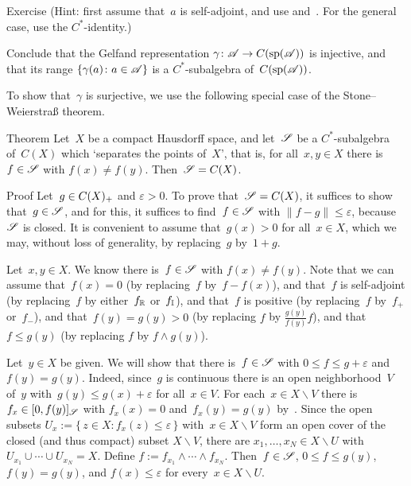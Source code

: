 \documentclass[a]{subfiles}
\begin{document}
\begin{parsec}
\begin{point}{Exercise}
(Hint: first assume that~$a$ is self-adjoint,
and use  and~.
For the general case,
use the $C^*$-identity.)

Conclude that the Gelfand representation $\gamma\colon \mathscr{A}\to C(\mathrm{sp}(\mathscr{A}))$
is injective,
and that its range $\{\gamma(a)\colon a\in\mathscr{A}\}$
is a $C^*$-subalgebra of~$C(\mathrm{sp}(\mathscr{A}))$.
\end{point}
\begin{point}%
To show that~$\gamma$ is surjective,
we use the following special case of
the Stone--Weierstra\ss{} theorem. 
\end{point}
\begin{point}{Theorem}%
Let~$X$ be a compact Hausdorff space,
and let~$\mathscr{S}$ be a $C^*$-subalgebra of~$C(X)$
which `separates the points of~$X$',
that is, for all~$x,y\in X$
there is~$f\in \mathscr{S}$ with $f(x)\neq f(y)$.
Then~$\mathscr{S}=C(X)$.
\begin{point}{Proof}%
Let~$g\in C(X)_{+}$ and $\varepsilon >0$.
To prove that~$\mathscr{S}=C(X)$,
it suffices to show that~$g\in \mathscr{S}$,
and for this,
it suffices to find~$f\in \mathscr{S}$ with $\|f-g\|\leq \varepsilon$,
because~$\mathscr{S}$ is closed.
It is convenient to assume that~$g(x)> 0$ for all~$x\in X$,
which we may, without loss of generality,
by replacing~$g$ by~$1+g$.

\begin{point}%
Let~$x,y\in X$.
We know there is~$f\in \mathscr{S}$ with $f(x)\neq f(y)$.
Note that we can assume that~$f(x)=0$ (by replacing~$f$ by~$f-f(x)$),
and that~$f$ is self-adjoint (by replacing~$f$
by either~$f_{\mathbb{R}}$ or~$f_{\mathbb{I}}$),
and that~$f$ is positive
(by replacing~$f$ by~$f_+$ or~$f_-$),
and that~$f(y)=g(y)>0$
(by replacing $f$ by $\frac{g(y)}{f(y)} f$),
and that~$f\leq g(y)$
(by replacing $f$ by $f\wedge g(y)$).
\end{point}
\begin{point}%
Let~$y\in X$ be given.
We will show that there is~$f\in\mathscr{S}$
with $0\leq f\leq g+\varepsilon$
and~$f(y)=g(y)$.
Indeed,
since~$g$ is continuous
there is an open neighborhood~$V$ of~$y$
with~$g(y) \leq  g(x)+\varepsilon$
for all~$x\in V$.
For each~$x\in X\backslash V$ there is $f_x \in [0,f(y)]_{\mathscr{S}}$
with $f_x(x)=0$ and~$f_x(y)=g(y)$ by~.
Since the open subsets
$U_x := \{\,z\in X\colon f_x(z)\leq \varepsilon\,\}$
with~$x\in X\backslash V$
form an open cover of the closed (and thus compact) subset $X\backslash V$,
there are $x_1,\dotsc,x_N\in X\backslash U$
with $U_{x_1}\cup\dotsb\cup U_{x_N}=X$.
Define $f:=f_{x_1}\wedge \dotsb \wedge f_{x_N}$.
Then~$f\in \mathscr{S}$, $0\leq f\leq g(y)$, $f(y)=g(y)$,
and $f(x)\leq \varepsilon$
for every~$x\in X\backslash U$.


\end{point}
\end{point}
\end{point}
\end{parsec}
\end{document}
